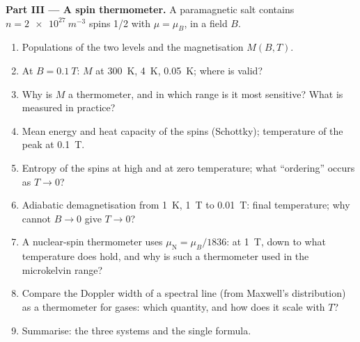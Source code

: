 \begin{problem}
\textbf{Part III --- A spin thermometer.}
A paramagnetic salt contains $n = \qty{2e27}{m^{-3}}$ spins 1/2 with $\mu
= \mu_B$, in a field $B$.
\begin{enumerate}[resume]
  \item Populations of the two levels and the magnetisation
        $M(B,T)$.
  \item At $B = \qty{0.1}{T}$: $M$ at \qty{300}{K}, \qty{4}{K}, \qty{0.05}{K};
        where is  valid?
  \item Why is $M$ a thermometer, and in which range is it most
        sensitive? What is measured in practice?
  \item Mean energy and heat capacity of the spins (Schottky);
        temperature of the peak at \qty{0.1}{T}.
  \item Entropy of the spins at high and at zero temperature; what
        ``ordering'' occurs as $T \to 0$?
  \item Adiabatic demagnetisation from \qty{1}{K}, \qty{1}{T} to \qty{0.01}{T}:
        final temperature; why cannot $B \to 0$ give $T \to 0$?
  \item A nuclear-spin thermometer uses $\mu_{\text{N}} = \mu_B/1836$: at
        \qty{1}{T}, down to what temperature does  hold, and
        why is such a thermometer used in the microkelvin range?
  \item Compare the Doppler width of a spectral line (from Maxwell's
        distribution) as a thermometer for gases: which quantity, and
        how does it scale with $T$?
  \item Summarise: the three systems and the single formula.
\end{enumerate}
\end{problem}
